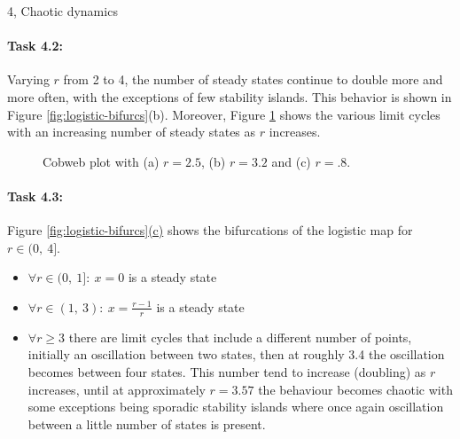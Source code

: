 \documentclass[10pt,a4paper]{article}
\begin{document}
\begin{task}{4, Chaotic dynamics}
\paragraph{Task 4.2:}
Varying $r$ from 2 to 4, the number of steady states continue to double more and more often, with the exceptions of few stability islands.
This behavior is shown in Figure \ref{fig:logistic-bifurcs}(b).
Moreover, Figure \ref{fig:cobweb-4.2} shows the various limit cycles with an increasing number of steady states as $r$ increases.

\begin{figure}[H]
    \centering
    \hfill
    \hfill
    \caption{Cobweb plot with (a) $r = 2.5$, (b) $r = 3.2$ and (c) $r = .8$.}
    \label{fig:cobweb-4.2}
\end{figure}

\paragraph{Task 4.3:}
Figure \hyperref[fig:logistic-bifurcs]{\ref{fig:logistic-bifurcs}(c)} shows the bifurcations of the logistic map for $r \in (0,\ 4]$.
\begin{itemize}
    \item $\forall r \in (0,\ 1]:\ x = 0$ is a steady state
    \item $\forall r \in (1,\ 3):\ x = \frac{r-1}{r}$ is a steady state
    \item $\forall r \geq 3$ there are limit cycles that include a different number of points, initially an oscillation between two states, then at roughly 3.4 the oscillation becomes between four states.
    This number tend to increase (doubling) as $r$ increases, until at approximately $r=3.57$ the behaviour becomes chaotic with some exceptions being sporadic stability islands where once again oscillation between a little number of states is present.
\end{itemize}


\end{task}
\end{document}
